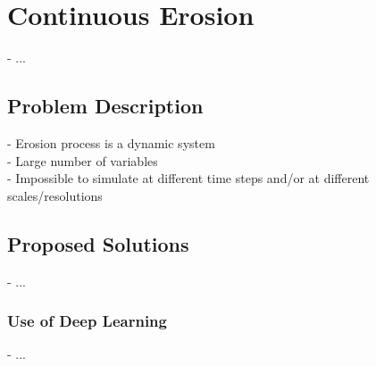 \chapter{Continuous Erosion}
\label{chap:continuous-erosion}
\minitoc

- ...

\section{Problem Description}
\label{sec:continuous-erosion_problematic}
- Erosion process is a dynamic system \\
- Large number of variables \\
- Impossible to simulate at different time steps and/or at different scales/resolutions

\section{Proposed Solutions}
\label{sec:continuous-erosion_solutions}
- ...

\subsection{Use of Deep Learning}
- ...

